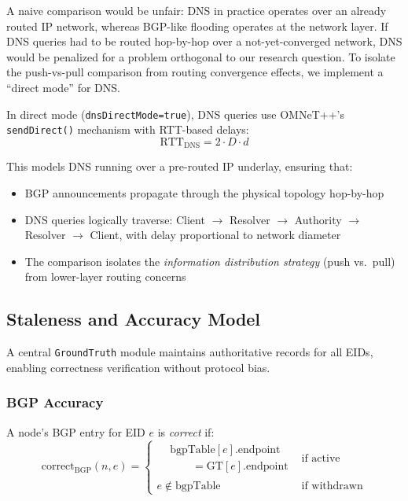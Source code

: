 \documentclass[journal,twocolumn]{IEEEtran}
\begin{document}
A naive comparison would be unfair: DNS in practice operates over an already routed IP network, whereas BGP-like flooding operates at the network layer. 
If DNS queries had to be routed hop-by-hop over a not-yet-converged network, DNS would be penalized for a problem orthogonal to our research question. 
To isolate the push-vs-pull comparison from routing convergence effects, we implement a ``direct mode'' for DNS.

In direct mode (\texttt{dnsDirectMode=true}), DNS queries use OMNeT++'s \texttt{sendDirect()} mechanism with RTT-based delays:
\begin{equation}
\text{RTT}_{\text{DNS}} = 2 \cdot D \cdot d
\end{equation}

This models DNS running over a pre-routed IP underlay, ensuring that:
\begin{itemize}
    \item BGP announcements propagate through the physical topology hop-by-hop
    \item DNS queries logically traverse: Client $\to$ Resolver $\to$ Authority $\to$ Resolver $\to$ Client, with delay proportional to network diameter
    \item The comparison isolates the \emph{information distribution strategy} (push vs.\ pull) from lower-layer routing concerns
\end{itemize}

\subsection{Staleness and Accuracy Model}
\label{sec_staleness}

A central \texttt{GroundTruth} module maintains authoritative records for all EIDs, enabling correctness verification without protocol bias.

\subsubsection{BGP Accuracy}

A node's BGP entry for EID $e$ is \emph{correct} if:
\begin{equation}
\text{correct}_{\text{BGP}}(n, e) =
\begin{cases}
\begin{aligned}
&\text{bgpTable}[e].\text{endpoint} \\
&\qquad = \text{GT}[e].\text{endpoint}
\end{aligned}
& \text{if active} \\[6pt]
e \notin \text{bgpTable}
& \text{if withdrawn}
\end{cases}
\end{equation}
\end{document}
